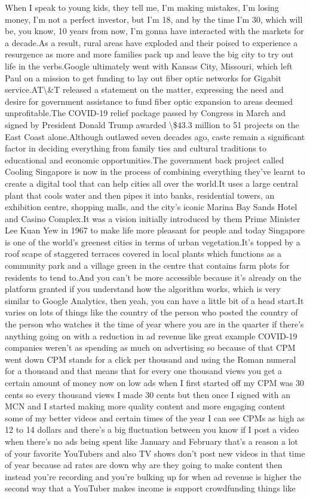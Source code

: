 \documentclass{article}%
\begin{document}
When I speak to young kids, they tell me, I'm making mistakes, I'm losing money, I'm not a perfect investor, but I'm 18, and by the time I'm 30, which will be, you know, 10 years from now, I'm gonna have interacted with the markets for a decade.As a result, rural areas have exploded and their poised to experience a resurgence as more and more families pack up and leave the big city to try out life in the verbs.Google ultimately went with Kansas City, Missouri, which left Paul on a mission to get funding to lay out fiber optic networks for Gigabit service.AT\textbackslash{}\&T released a statement on the matter, expressing the need and desire for government assistance to fund fiber optic expansion to areas deemed unprofitable.The COVID{-}19 relief package passed by Congress in March and signed by President Donald Trump awarded \textbackslash{}\$43.3 million to 51 projects on the East Coast alone.Although outlawed seven decades ago, caste remain a significant factor in deciding everything from family ties and cultural traditions to educational and economic opportunities.The government back project called Cooling Singapore is now in the process of combining everything they've learnt to create a digital tool that can help cities all over the world.It uses a large central plant that cools water and then pipes it into banks, residential towers, an exhibition centre, shopping malls, and the city's iconic Marina Bay Sands Hotel and Casino Complex.It was a vision initially introduced by them Prime Minister Lee Kuan Yew in 1967 to make life more pleasant for people and today Singapore is one of the world's greenest cities in terms of urban vegetation.It's topped by a roof scape of staggered terraces covered in local plants which functions as a community park and a village green in the centre that contains farm plots for residents to tend to.And you can't be more accessible because it's already on the platform granted if you understand how the algorithm works, which is very similar to Google Analytics, then yeah, you can have a little bit of a head start.It varies on lots of things like the country of the person who posted the country of the person who watches it the time of year where you are in the quarter if there's anything going on with a reduction in ad revenue like great example COVID{-}19 companies weren't as spending as much on advertising so because of that CPM went down CPM stands for a click per thousand and using the Roman numeral for a thousand and that means that for every one thousand views you get a certain amount of money now on low ads when I first started off my CPM was 30 cents so every thousand views I made 30 cents but then once I signed with an MCN and I started making more quality content and more engaging content some of my better videos and certain times of the year I can see CPMs as high as 12 to 14 dollars and there's a big fluctuation between you know if I post a video when there's no ads being spent like January and February that's a reason a lot of your favorite YouTubers and also TV shows don't post new videos in that time of year because ad rates are down why are they going to make content then instead you're recording and you're bulking up for when ad revenue is higher the second way that a YouTuber makes income is support crowdfunding things like 
\end{document}
